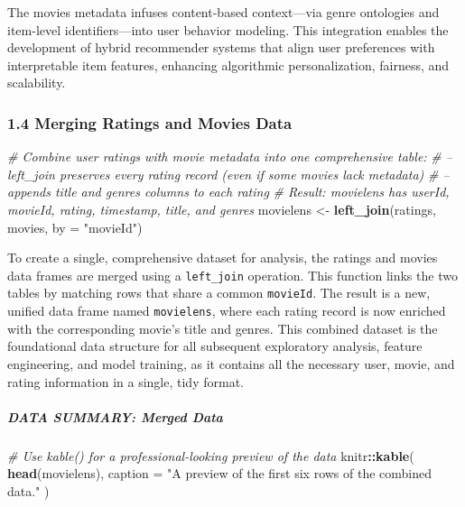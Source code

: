 \documentclass[
]{article}
\newenvironment{Shaded}{\begin{snugshade}}{\end{snugshade}}
\newcommand{\AttributeTok}[1]{\textcolor[rgb]{0.13,0.29,0.53}{#1}}
\newcommand{\CommentTok}[1]{\textcolor[rgb]{0.56,0.35,0.01}{\textit{#1}}}
\newcommand{\FunctionTok}[1]{\textcolor[rgb]{0.13,0.29,0.53}{\textbf{#1}}}
\newcommand{\NormalTok}[1]{#1}
\newcommand{\OtherTok}[1]{\textcolor[rgb]{0.56,0.35,0.01}{#1}}
\newcommand{\SpecialCharTok}[1]{\textcolor[rgb]{0.81,0.36,0.00}{\textbf{#1}}}
\newcommand{\StringTok}[1]{\textcolor[rgb]{0.31,0.60,0.02}{#1}}
\begin{document}
The movies metadata infuses content-based context---via genre ontologies
and item-level identifiers---into user behavior modeling. This
integration enables the development of hybrid recommender systems that
align user preferences with interpretable item features, enhancing
algorithmic personalization, fairness, and scalability.

\subsubsection{1.4 Merging Ratings and Movies
Data}\label{merging-ratings-and-movies-data}

\begin{Shaded}
\begin{Highlighting}[]
\CommentTok{\# Combine user ratings with movie metadata into one comprehensive table:}
\CommentTok{\# – left\_join preserves every rating record (even if some movies lack metadata)}
\CommentTok{\# – appends title and genres columns to each rating}
\CommentTok{\# Result: movielens has userId, movieId, rating, timestamp, title, and genres}
\NormalTok{movielens }\OtherTok{\textless{}{-}} \FunctionTok{left\_join}\NormalTok{(ratings, movies, }\AttributeTok{by =} \StringTok{"movieId"}\NormalTok{)}
\end{Highlighting}
\end{Shaded}

To create a single, comprehensive dataset for analysis, the ratings and
movies data frames are merged using a \texttt{left\_join} operation.
This function links the two tables by matching rows that share a common
\texttt{movieId}. The result is a new, unified data frame named
\texttt{movielens}, where each rating record is now enriched with the
corresponding movie's title and genres. This combined dataset is the
foundational data structure for all subsequent exploratory analysis,
feature engineering, and model training, as it contains all the
necessary user, movie, and rating information in a single, tidy format.

\subparagraph{DATA SUMMARY: Merged Data}\label{data-summary-merged-data}

\begin{Shaded}
\begin{Highlighting}[]
\CommentTok{\# Use kable() for a professional{-}looking preview of the data}
\NormalTok{knitr}\SpecialCharTok{::}\FunctionTok{kable}\NormalTok{(}
  \FunctionTok{head}\NormalTok{(movielens), }
  \AttributeTok{caption =} \StringTok{"A preview of the first six rows of the combined data."}
\NormalTok{)}
\end{Highlighting}
\end{Shaded}
\end{document}
